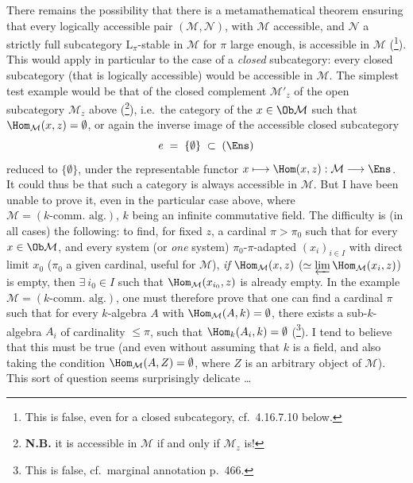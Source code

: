 There remains the possibility that there is a metamathematical theorem ensuring that every logically accessible pair $(\mathcal{M},\mathcal{N})$, with $\mathcal{M}$ accessible, and $\mathcal{N}$ a strictly full subcategory $\mathrm{L}_\pi$-stable in $\mathcal{M}$ for $\pi$ large enough, is accessible in $\mathcal{M}$ (\footnote[188]{This is false, even for a closed subcategory, cf.\ 4.16.7.10 below.}). This would apply in particular to the case of a \textit{closed} subcategory: every closed subcategory (that is logically accessible) would be accessible in $\mathcal{M}$. The simplest test example would be that of the closed complement $\mathcal{M}'_z$ of the open subcategory $\mathcal{M}_z$ above (\footnote[189]{\textbf{N.B.} it is accessible in $\mathcal{M}$ if and only if $\mathcal{M}_z$ is! %
}), i.e.\ the category of the $x \in \Ob\mathcal{M}$ such that $\Hom_{\mathcal{M}}(x,z) = \emptyset$, or again
the inverse image of the accessible closed subcategory
\[
e \;=\; \{\emptyset\} \;\subset\; (\Ens)
\]
reduced to $\{\emptyset\}$, under the representable functor $x \longmapsto \Hom(x,z) : \mathcal{M} \longrightarrow \Ens$. It could thus be that such a category is always accessible in $\mathcal{M}$. But I have been unable to
prove it, even in the particular case above, where $\mathcal{M} = (k\text{-comm.\ alg.})$, $k$ being an infinite commutative field. The difficulty is (in all cases) the following: to find, for fixed $z$, a cardinal $\pi > \pi_0$ such that for every $x \in \Ob\mathcal{M}$, and every system (or \textit{one} system) $\pi_0$-$\pi$-adapted $(x_i)_{i\in I}$ with direct limit $x_0$ ($\pi_0$ a given cardinal, useful for $\mathcal{M}$), \textit{if} $\Hom_{\mathcal{M}}(x,z)$ ($\simeq \varprojlim \Hom_{\mathcal{M}}(x_i,z)$) is empty, then $\exists\ i_0 \in I$ such that $\Hom_{\mathcal{M}}(x_{i_0},z)$ is already empty. In the example $\mathcal{M} = (k\text{-comm.\ alg.})$, one must therefore prove that one can find a cardinal $\pi$
such that for every $k$-algebra $A$ with $\Hom_{\mathcal{M}}(A,k) = \emptyset$, there exists a sub-$k$-algebra $A_i$ of %
cardinality $\leqslant \pi$, such that $\Hom_k(A_i,k) = \emptyset$ (\footnote[190]{This is false, cf.\ marginal annotation p.~466.}). I tend to believe that this must be true (and even without
assuming that $k$ is a field, and also taking the condition $\Hom_{\mathcal{M}}(A,Z) = \emptyset$, where $Z$ is an arbitrary object of $\mathcal{M}$). This sort of question seems surprisingly delicate \dots %

